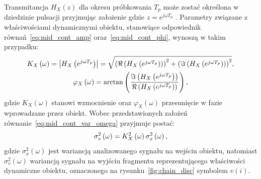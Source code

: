 Transmitancja $H_{X}(z)$ dla okresu próbkowania $T_{p}$ może zostać określona w dziedzinie pulsacji przyjmując założenie gdzie $z = e^{j\omega T_{p}}$ \cite{proakis_dsp}. Parametry związane z właściwościami dynamicznymi obiektu, stanowiące odpowiednik równań~\eqref{eq:mid_cont_amp} oraz~\eqref{eq:mid_cont_phi}, wynoszą w takim przypadku:
\begin{gather}
K_{X} \left(\omega\right) = \left| H_{X} \left(e^{j\omega T_{p}}\right) \right| = \sqrt{\left( \Re \left( H_{X} \left(e^{j\omega T_{p}}\right) \right) \right)^{2} + \left( \Im \left( H_{X} \left(e^{j\omega T_{p}}\right) \right) \right)^{2}} \label{eq:mid_disc_amp}, \\
\varphi_{X} \left(\omega\right) = \arctan \left( \frac{\Im \left( H_{X} \left(e^{j\omega T_{p}}\right) \right)}{\Re \left( H_{X} \left(e^{j\omega T_{p}}\right) \right)} \right) \label{eq:mid_disc_phi},
\end{gather}
gdzie $K_{X}(\omega)$ stanowi wzmocnienie oraz $\varphi_{X}(\omega)$ przesunięcie w fazie wprowadzane przez obiekt. Wobec przedstawionych założeń równanie~\eqref{eq:mid_cont_var_omega} przyjmuje postać:
\begin{equation}
\sigma_{v}^{2} \left(\omega\right) = K_{X}^{2} \left(\omega\right) \sigma_{x}^{2} \left(\omega\right) \label{eq:mid_disc_var_omega},
\end{equation}
gdzie $\sigma_{x}^{2}(\omega)$ jest wariancją analizowanego sygnału na wejściu obiektu, natomiast $\sigma_{v}^{2}(\omega)$ wariancją sygnału na wyjściu fragmentu reprezentującego właściwości dynamiczne obiektu, oznaczonego na rysunku~\ref{fig:chain_disc} symbolem $v(i)$.

